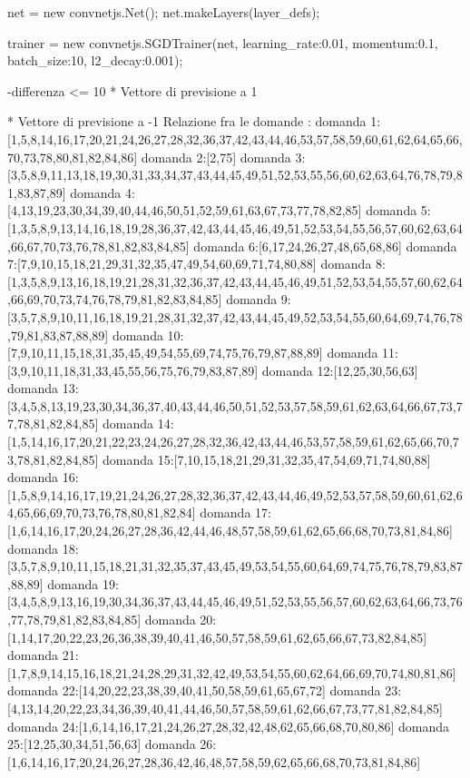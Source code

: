 net = new convnetjs.Net();
net.makeLayers(layer_defs);

trainer = new convnetjs.SGDTrainer(net, {learning_rate:0.01, momentum:0.1, batch_size:10, l2_decay:0.001});

-differenza <= 10
* Vettore di previsione a 1

* Vettore di previsione a -1
Relazione fra le domande :
domanda 1:[1,5,8,14,16,17,20,21,24,26,27,28,32,36,37,42,43,44,46,53,57,58,59,60,61,62,64,65,66,70,73,78,80,81,82,84,86]
domanda 2:[2,75]
domanda 3:[3,5,8,9,11,13,18,19,30,31,33,34,37,43,44,45,49,51,52,53,55,56,60,62,63,64,76,78,79,81,83,87,89]
domanda 4:[4,13,19,23,30,34,39,40,44,46,50,51,52,59,61,63,67,73,77,78,82,85]
domanda 5:[1,3,5,8,9,13,14,16,18,19,28,36,37,42,43,44,45,46,49,51,52,53,54,55,56,57,60,62,63,64,66,67,70,73,76,78,81,82,83,84,85]
domanda 6:[6,17,24,26,27,48,65,68,86]
domanda 7:[7,9,10,15,18,21,29,31,32,35,47,49,54,60,69,71,74,80,88]
domanda 8:[1,3,5,8,9,13,16,18,19,21,28,31,32,36,37,42,43,44,45,46,49,51,52,53,54,55,57,60,62,64,66,69,70,73,74,76,78,79,81,82,83,84,85]
domanda 9:[3,5,7,8,9,10,11,16,18,19,21,28,31,32,37,42,43,44,45,49,52,53,54,55,60,64,69,74,76,78,79,81,83,87,88,89]
domanda 10:[7,9,10,11,15,18,31,35,45,49,54,55,69,74,75,76,79,87,88,89]
domanda 11:[3,9,10,11,18,31,33,45,55,56,75,76,79,83,87,89]
domanda 12:[12,25,30,56,63]
domanda 13:[3,4,5,8,13,19,23,30,34,36,37,40,43,44,46,50,51,52,53,57,58,59,61,62,63,64,66,67,73,77,78,81,82,84,85]
domanda 14:[1,5,14,16,17,20,21,22,23,24,26,27,28,32,36,42,43,44,46,53,57,58,59,61,62,65,66,70,73,78,81,82,84,85]
domanda 15:[7,10,15,18,21,29,31,32,35,47,54,69,71,74,80,88]
domanda 16:[1,5,8,9,14,16,17,19,21,24,26,27,28,32,36,37,42,43,44,46,49,52,53,57,58,59,60,61,62,64,65,66,69,70,73,76,78,80,81,82,84]
domanda 17:[1,6,14,16,17,20,24,26,27,28,36,42,44,46,48,57,58,59,61,62,65,66,68,70,73,81,84,86]
domanda 18:[3,5,7,8,9,10,11,15,18,21,31,32,35,37,43,45,49,53,54,55,60,64,69,74,75,76,78,79,83,87,88,89]
domanda 19:[3,4,5,8,9,13,16,19,30,34,36,37,43,44,45,46,49,51,52,53,55,56,57,60,62,63,64,66,73,76,77,78,79,81,82,83,84,85]
domanda 20:[1,14,17,20,22,23,26,36,38,39,40,41,46,50,57,58,59,61,62,65,66,67,73,82,84,85]
domanda 21:[1,7,8,9,14,15,16,18,21,24,28,29,31,32,42,49,53,54,55,60,62,64,66,69,70,74,80,81,86]
domanda 22:[14,20,22,23,38,39,40,41,50,58,59,61,65,67,72]
domanda 23:[4,13,14,20,22,23,34,36,39,40,41,44,46,50,57,58,59,61,62,66,67,73,77,81,82,84,85]
domanda 24:[1,6,14,16,17,21,24,26,27,28,32,42,48,62,65,66,68,70,80,86]
domanda 25:[12,25,30,34,51,56,63]
domanda 26:[1,6,14,16,17,20,24,26,27,28,36,42,46,48,57,58,59,62,65,66,68,70,73,81,84,86]
